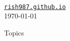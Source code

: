 \begin{center}
  {\LARGE {}}\\
  \vspace{10pt}
  \large 
  \href{https://rish987.github.io/}{\tt {rish987.github.io}}\\
  \vspace{7pt}
  \today
\end{center}

\begin{part}{Topics}
\end{part}
